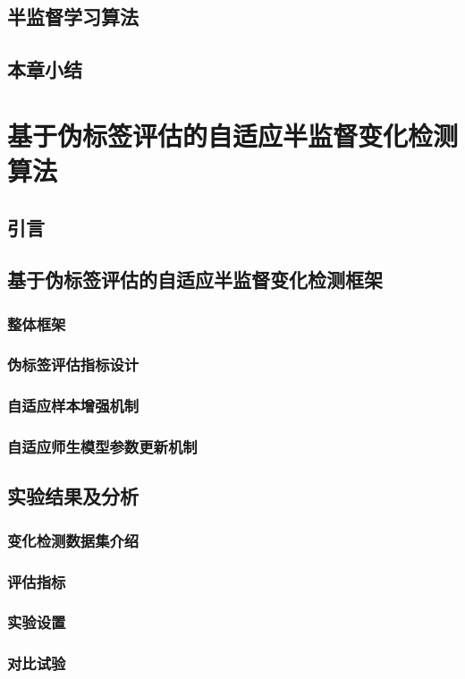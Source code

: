 \documentclass[lang=chs, degree=master, blindreview=false, adobe=false]{yanputhesis}
\begin{document}
\section{半监督学习算法}
\section{本章小结}
\chapter{基于伪标签评估的自适应半监督变化检测算法}
\section{引言}
\section{基于伪标签评估的自适应半监督变化检测框架}
\subsection{整体框架}
\subsection{伪标签评估指标设计}
\subsection{自适应样本增强机制}
\subsection{自适应师生模型参数更新机制}
\section{实验结果及分析}
\subsection{变化检测数据集介绍}
\subsection{评估指标}
\subsection{实验设置}
\subsection{对比试验}
\end{document}
